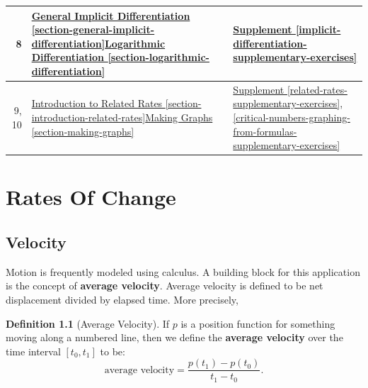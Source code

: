 \documentclass[10pt,oneside,]{book}
\newcommand{\terminology}[1]{\textbf{#1}}
\theoremstyle{plain}
\theoremstyle{definition}
\newtheorem{definition}[theorem]{Definition}
\numberwithin{equation}{section}
\newcommand{\fe}[2]{#1\mathopen{}\left(#2\right)\mathclose{}}
\newcommand{\cinterval}[2]{\left[#1,#2\right]}
\begin{document}
\begin{tabular}{rp{3in}p{1.1in}}
\midrule
8&\hyperref[section-general-implicit-differentiation]{General Implicit Differentiation \ref{section-general-implicit-differentiation}}\textendash{}\hyperref[section-logarithmic-differentiation]{Logarithmic Differentiation \ref{section-logarithmic-differentiation}}&\hyperref[implicit-differentiation-supplementary-exercises]{Supplement \ref{implicit-differentiation-supplementary-exercises}}\\
\midrule
9, 10&\hyperref[section-introduction-related-rates]{Introduction to Related Rates \ref{section-introduction-related-rates}}\textendash{}\hyperref[section-making-graphs]{Making Graphs \ref{section-making-graphs}}&\hyperref[related-rates-supplementary-exercises]{Supplement \ref{related-rates-supplementary-exercises}}, \hyperref[critical-numbers-graphing-from-formulas-supplementary-exercises]{\ref{critical-numbers-graphing-from-formulas-supplementary-exercises}}\\
\bottomrule
\end{tabular}
\setcounter{tocdepth}{1}
\renewcommand*\contentsname{Contents}
\tableofcontents
\mainmatter
\typeout{************************************************}
\typeout{************************************************}
\chapter[Rates Of Change]{Rates Of Change}\label{chapter-rates-of-change}
\typeout{************************************************}
\typeout{************************************************}
\section[Velocity]{Velocity}\label{section-velocity}
Motion is frequently modeled using calculus. A building block for this application is the concept of \terminology{average velocity}. Average velocity is defined to be net displacement divided by elapsed time.  More precisely,%
\begin{definition}[Average Velocity]\label{definition-average-velocity}
If \(p\) is a position function for something moving along a numbered line, then we define the \terminology{average velocity} over the time interval \(\cinterval{t_0}{t_1}\) to be: \[\text{average velocity}=\frac{\fe{p}{t_1}-\fe{p}{t_0}}{t_1-t_0}\text{.}\]%
\end{definition}
\typeout{************************************************}
\typeout{************************************************}
\end{document}
